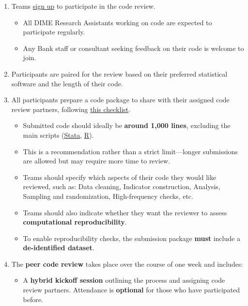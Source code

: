 \documentclass{tufte-handout}
\begin{document}
\begin{fullwidth}
\begin{enumerate}
    \item Teams \href{https://survey.wb.surveycto.com/collect/code_review_sign_up?caseid=}{sign up} to participate in the code review.
    \begin{itemize}
        \item All DIME Research Assistants working on code are expected to participate regularly.
        \item Any Bank staff or consultant seeking feedback on their code is welcome to join.
    \end{itemize}
    \item Participants are paired for the review based on their preferred statistical software and the length of their code.
    \item All participants prepare a code package to share with their assigned code review partners, following \href{https://github.com/worldbank/dime-standards/blob/master/dime-coding-standards/checklists/Peer%20Code%20Review%20Submission%20Checklist.pdf}{this checklist}.
    \begin{itemize}
        \item Submitted code should ideally be \textbf{around 1,000 lines}, excluding the main scripts (\href{https://github.com/worldbank/wb-reproducible-research-repository/blob/main/resources/main.do}{Stata}, \href{https://github.com/worldbank/wb-reproducible-research-repository/blob/main/resources/main.R}{R}).
        \item This is a recommendation rather than a strict limit—longer submissions are allowed but may require more time to review.
        \item Teams should specify which aspects of their code they would like reviewed, such as: Data cleaning, Indicator construction, Analysis, Sampling and randomization, High-frequency checks, etc.
        \item Teams should also indicate whether they want the reviewer to assess \textbf{computational reproducibility}.
        \item To enable reproducibility checks, the submission package \textbf{must} include a \textbf{de-identified dataset}.
    \end{itemize}
    \item The \textbf{peer code review} takes place over the course of one week and includes:
    \begin{itemize}
        \item A \textbf{hybrid kickoff session} outlining the process and assigning code review partners. Attendance is \textbf{optional} for those who have participated before.

\end{itemize}
\end{enumerate}
\end{fullwidth}
\end{document}
